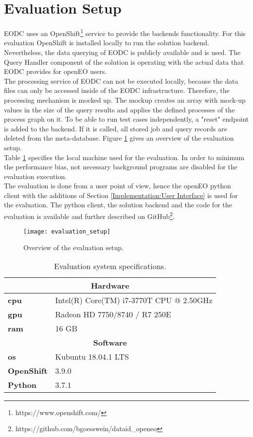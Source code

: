 \documentclass[draft,final]{vutinfth} %
\begin{document}
\section{Evaluation Setup}\label{Evaluation:Setup}

EODC uses an OpenShift\footnote{https://www.openshift.com/} service to provide the backends functionality. For this evaluation OpenShift is installed locally to run the solution backend. Nevertheless, the data querying of EODC is publicly available and is used. The Query Handler component of the solution is operating with the actual data that EODC provides for openEO users. \\
The processing service of EODC can not be executed locally, because the data files can only be accessed inside of the EODC infrastructure. Therefore, the processing mechanism is mocked up. The mockup creates an array with mock-up values in the size of the query results and applies the defined processes of the process graph on it. To be able to run test cases independently, a "reset" endpoint is added to the backend. If it is called, all stored job and query records are deleted from the meta-database. Figure \ref{fig:evaluation_setup} gives an overview of the evaluation setup. \\
Table \ref{Tab:eva_hardware} specifies the local machine used for the evaluation. In order to minimum the performance bias, not necessary background programs are disabled for the evaluation execution.\\  
The evaluation is done from a user point of view, hence the openEO python client with the additions of Section \ref{Implementation:User Interface} is used for the evaluation. The python client, the solution backend and the code for the evaluation is available and further described on GitHub\footnote{https://github.com/bgoesswein/dataid\_openeo}. 

\begin{figure}[h]
	\centering
	\texttt{[image: evaluation\_setup]}
	\caption{Overview of the evaluation setup.}
	\label{fig:evaluation_setup} %
\end{figure}

\begin{table}[]
	\caption{Evaluation system specifications.}
	\centering
	\begin{tabular}{l|l}
		\multicolumn{2}{c}{\textbf{Hardware}} \\ \hline
		\textbf{\acrshort{cpu}} & Intel(R) Core(TM) i7-3770T CPU @ 2.50GHz \\ 
		\textbf{\acrshort{gpu}} & Radeon HD 7750/8740 / R7 250E  \\ 
		\textbf{\acrshort{ram}} & 16 GB  \\ 
		\multicolumn{2}{c}{\textbf{Software}} \\ \hline
		\textbf{\acrshort{os}} & Kubuntu 18.04.1 LTS \\ 
		\textbf{OpenShift} & 3.9.0  \\ 
		\textbf{Python} & 3.7.1  \\ 
	\end{tabular}
	\label{Tab:eva_hardware}
\end{table}
\end{document}
